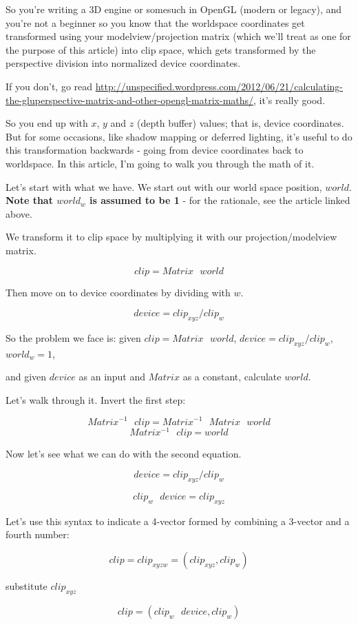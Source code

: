 \documentclass{article}
\begin{document}
So you're writing a 3D engine or somesuch in OpenGL (modern or legacy), and you're not a beginner
so you know that the worldspace coordinates get transformed using your modelview/projection matrix (which
we'll treat as one for the purpose of this article) into clip space, which gets transformed by the
perspective division into normalized device coordinates.

If you don't, go read \url{http://unspecified.wordpress.com/2012/06/21/calculating-the-gluperspective-matrix-and-other-opengl-matrix-maths/}, it's really good.

So you end up with $x$, $y$ and $z$ (depth buffer) values; that is, device coordinates.
But for some occasions, like shadow mapping or deferred lighting, it's useful to do this transformation
backwards - going from device coordinates back to worldspace. In this article, I'm going to walk you
through the math of it.

Let's start with what we have. We start out with our world space position, $world$. \textbf{Note that $world_w$
is assumed to be 1} - for the rationale, see the article linked above.

We transform it to clip space by multiplying it with our projection/modelview matrix.

$$clip = Matrix\text{ }world$$

Then move on to device coordinates by dividing with $w$.

$$device = clip_{xyz} / clip_w$$

So the problem we face is: given $clip = Matrix\text{ }world$, $device = clip_{xyz} / clip_w$, $world_w = 1$,

and given $device$ as an input and $Matrix$ as a constant, calculate $world$.

Let's walk through it. Invert the first step:

$$Matrix^{-1}\text{ }clip = Matrix^{-1}\text{ }Matrix\text{ }world$$
$$Matrix^{-1}\text{ }clip = world$$

Now let's see what we can do with the second equation.

$$device = clip_{xyz} / clip_w$$

$$clip_w\text{ }device = clip_{xyz}$$

Let's use this syntax to indicate a 4-vector formed by combining a 3-vector and a fourth number:

$$clip = clip_{xyzw} = (clip_{xyz}, clip_w)$$

substitute $clip_{xyz}$

$$clip = (clip_w\text{ }device, clip_w)$$
\end{document}
